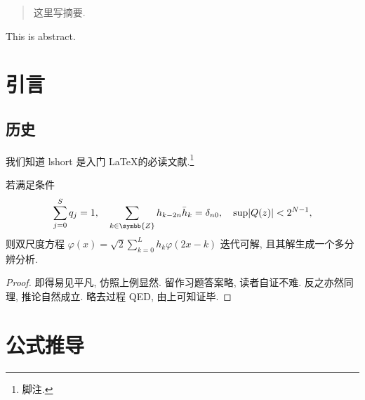 \documentclass[draft,newenv,newcmd]{ncuthesis}
\begin{document}
\maketitle
\frontmatter
\makedecaut
\begin{abstract}
这里写摘要.
\end{abstract}
\begin{abstract*}
This is abstract.
\end{abstract*}
\tableofcontents
\mainmatter
\chapter{引言}
\section{历史}
我们知道 lshort\cite{lshortcn} 是入门 \LaTeX 的必读文献.\footnote{脚注.}

\begin{theorem}
若满足条件
\[
  \sum_{j=0}^S q_j = 1,\quad
  \sum_{k\in\symbb{Z}} h_{k-2n}\bar{h}_k = \delta_{n0},\quad
  \sup \lvert Q(z)\rvert < 2^{N-1},
\]
则双尺度方程 $\varphi(x) = \sqrt{2}\sum_{k=0}^L h_k\varphi(2x-k)$ 迭代可解, 
且其解生成一个多分辨分析. 
\end{theorem}
\begin{proof}
即得易见平凡, 仿照上例显然. 留作习题答案略, 读者自证不难. 
反之亦然同理, 推论自然成立. 略去过程 QED, 由上可知证毕. \freeze
\end{proof}
\appendix
\chapter{公式推导}
\end{document}
